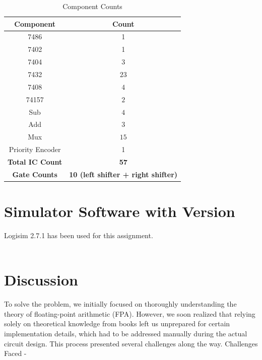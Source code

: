 \documentclass{article}
\begin{document}
\begin{table}[h!]
    \centering
    \begin{tabular}{|c|c|}
    \hline
    \textbf{Component} & \textbf{Count} \\
    \hline
    7486 & 1 \\
    \hline
    7402 & 1 \\
    \hline
    7404 & $ 3$ \\
    \hline
    7432 & $ 23$ \\
    \hline
    7408 & $ 4$ \\
    \hline
    74157 & $ 2$ \\
    \hline
    Sub & $ 4$ \\
    \hline
    Add & $ 3$ \\
    \hline
    Mux & $ 15$ \\
    \hline
    Priority Encoder & 1 \\
    \hline
    \textbf{Total IC Count} & \textbf{57} \\
    \hline
    \textbf{Gate Counts} & \textbf{10 (left shifter + right shifter)} \\
    \hline
    \end{tabular}
    \caption{Component Counts}
    \end{table}
\section{ Simulator Software with Version}
Logisim 2.7.1 has been used for this assignment.
\\ 
\\ 
\section{Discussion}
To solve the problem, we initially focused on thoroughly understanding the theory of floating-point arithmetic (FPA). However, we soon realized that relying solely on theoretical knowledge from books left us unprepared for certain implementation details, which had to be addressed manually during the actual circuit design. This process presented several challenges along the way.
Challenges Faced - 
\\ 
\end{document}
